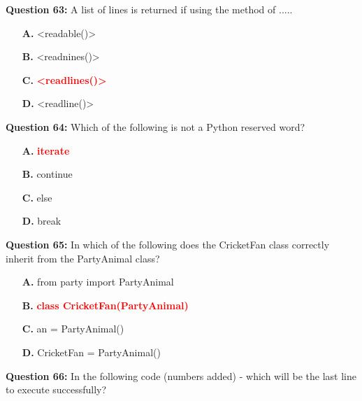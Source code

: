\documentclass[12pt,a4paper]{article}
\begin{document}
\vspace{0.5cm}

\textbf{Question 63:} A list of lines is returned if using the method of .....

\begin{itemize}
    \item[\textbf{A.}] <readable()>
    \item[\textbf{B.}] <readnines()>
    \item[\textbf{C.}] \textcolor{red}{\textbf{<readlines()>}}
    \item[\textbf{D.}] <readline()>
\end{itemize}

\vspace{0.5cm}

\textbf{Question 64:} Which of the following is not a Python reserved word?

\begin{itemize}
    \item[\textbf{A.}] \textcolor{red}{\textbf{iterate}}
    \item[\textbf{B.}] continue
    \item[\textbf{C.}] else
    \item[\textbf{D.}] break
\end{itemize}

\vspace{0.5cm}

\textbf{Question 65:} In which of the following does the CricketFan class correctly inherit from the PartyAnimal class?

\begin{itemize}
    \item[\textbf{A.}] from party import PartyAnimal
    \item[\textbf{B.}] \textcolor{red}{\textbf{class CricketFan(PartyAnimal)}}
    \item[\textbf{C.}] an = PartyAnimal()
    \item[\textbf{D.}] CricketFan = PartyAnimal()
\end{itemize}

\vspace{0.5cm}

\textbf{Question 66:} In the following code (numbers added) - which will be the last line to execute successfully?\newline

\newline
\newline
\end{document}
